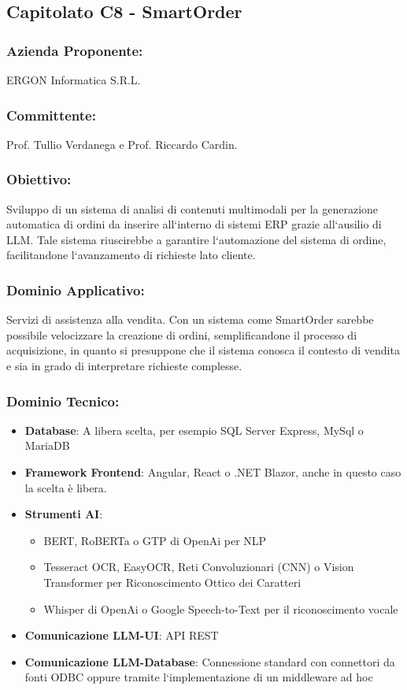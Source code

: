 \documentclass[a4paper,12pt]{article}
\begin{document}
\subsection{Capitolato C8 - SmartOrder}
\subsubsection*{Azienda Proponente:} ERGON Informatica S.R.L.
\subsubsection*{Committente:} Prof. Tullio Verdanega e Prof. Riccardo Cardin.
\subsubsection*{Obiettivo:} Sviluppo di un sistema di analisi di contenuti multimodali per la generazione automatica di ordini da inserire all`interno di sistemi ERP grazie all`ausilio di LLM. Tale sistema riuscirebbe a garantire l`automazione del sistema di ordine, facilitandone l`avanzamento di richieste lato cliente.
\subsubsection*{Dominio Applicativo:} Servizi di assistenza alla vendita. Con un sistema come SmartOrder sarebbe possibile velocizzare la creazione di ordini, semplificandone il processo di acquisizione, in quanto si presuppone che il sistema conosca il contesto di vendita e sia in grado di interpretare richieste complesse.
\subsubsection*{Dominio Tecnico:}
\begin{itemize}
    \item \textbf{Database}: A libera scelta, per esempio SQL Server Express, MySql o MariaDB
    \item \textbf{Framework Frontend}: Angular, React o .NET Blazor, anche in questo caso la scelta è libera.
    \item \textbf{Strumenti AI}: \begin{itemize}
              \item BERT, RoBERTa o GTP di OpenAi per NLP
              \item Tesseract OCR, EasyOCR, Reti Convoluzionari (CNN) o Vision Transformer per
                    Riconoscimento Ottico dei Caratteri
              \item Whisper di OpenAi o Google Speech-to-Text per il riconoscimento vocale
          \end{itemize}
    \item \textbf{Comunicazione LLM-UI}: API REST
    \item \textbf{Comunicazione LLM-Database}: Connessione standard con connettori da fonti ODBC oppure tramite l`implementazione di un middleware ad hoc
\end{itemize}
\end{document}
